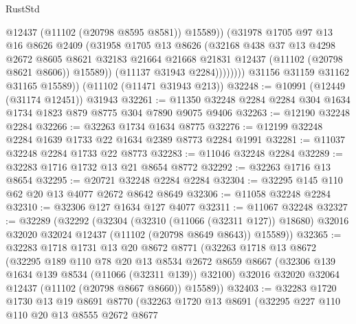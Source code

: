 \begin{lexlean}{RustStd}
\begin{coremodule}
                        @12437
                        (@11102 (@20798 @8595 @8581))
                        @15589))
                    (@31978
                      @1705
                      @97
                      @13
                      @16
                      @8626
                      @2409
                      (@31958
                        @1705
                        @13
                        @8626
                        (@32168
                          @438
                          @37
                          @13
                          @4298
                          @2672
                          @8605
                          @8621
                          @32183
                          @21664
                          @21668
                          @21831
                          @12437
                          (@11102 (@20798 @8621 @8606))
                          @15589))
                      (@11137 @31943 @2284))))))))
        @31156
        @31159
        @31162
        @31165
        @15589))
    (@11102 (@11471 @31943 @213))
@32248 := @10991 (@12449 (@31174 @12451)) @31943
@32261 := @11350 @32248 @2284 @2284 @304 @1634 @1734 @1823 @879 @8775 @304 @7890 @9075 @9406
@32263 := @12190 @32248 @2284
@32266 := @32263 @1734 @1634 @8775
@32276 := @12199 @32248 @2284 @1639 @1733 @22 @1634 @2389 @8773 @2284 @1991
@32281 := @11037 @32248 @2284 @1733 @22 @8773
@32283 := @11046 @32248 @2284
@32289 := @32283 @1716 @1732 @13 @21 @8654 @8772
@32292 := @32263 @1716 @13 @8654
@32295 := @20721 @32248 @2284 @2284
@32304 := @32295 @145 @110 @62 @20 @13 @4077 @2672 @8642 @8649
@32306 := @11058 @32248 @2284
@32310 := @32306 @127 @1634 @127 @4077
@32311 := @11067 @32248
@32327 := @32289
    (@32292
      (@32304
        (@32310 (@11066 (@32311 @127)) @18680)
        @32016
        @32020
        @32024
        @12437
        (@11102 (@20798 @8649 @8643))
        @15589))
@32365 := @32283
    @1718
    @1731
    @13
    @20
    @8672
    @8771
    (@32263
      @1718
      @13
      @8672
      (@32295
        @189
        @110
        @78
        @20
        @13
        @8534
        @2672
        @8659
        @8667
        (@32306 @139 @1634 @139 @8534 (@11066 (@32311 @139)) @32100)
        @32016
        @32020
        @32064
        @12437
        (@11102 (@20798 @8667 @8660))
        @15589))
@32403 := @32283
    @1720
    @1730
    @13
    @19
    @8691
    @8770
    (@32263
      @1720
      @13
      @8691
      (@32295
        @227
        @110
        @110
        @20
        @13
        @8555
        @2672
        @8677

\end{coremodule}
\end{lexlean}
